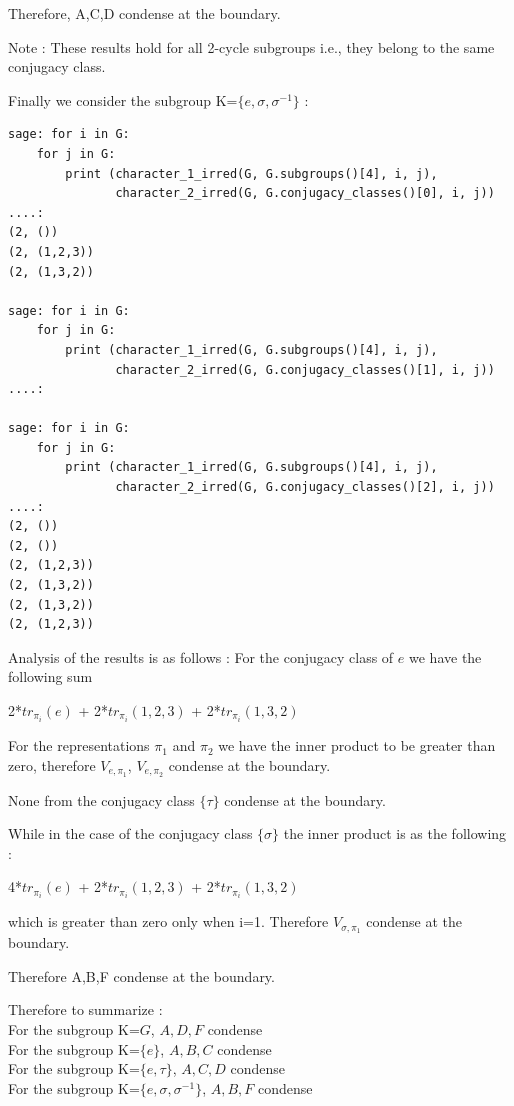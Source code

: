 Therefore, A,C,D condense at the boundary.

Note : These results hold for all 2-cycle subgroups i.e., they belong to the same conjugacy class.


Finally we consider the subgroup K=$\{e, \sigma, \sigma^{-1}\}$ :

\begin{lstlisting}[frame=single]
sage: for i in G:
    for j in G:
        print (character_1_irred(G, G.subgroups()[4], i, j), 
               character_2_irred(G, G.conjugacy_classes()[0], i, j))
....: 
(2, ())
(2, (1,2,3))
(2, (1,3,2))

sage: for i in G:
    for j in G:
        print (character_1_irred(G, G.subgroups()[4], i, j), 
               character_2_irred(G, G.conjugacy_classes()[1], i, j))
....: 

sage: for i in G:
    for j in G:
        print (character_1_irred(G, G.subgroups()[4], i, j), 
               character_2_irred(G, G.conjugacy_classes()[2], i, j))
....: 
(2, ())
(2, ())
(2, (1,2,3))
(2, (1,3,2))
(2, (1,3,2))
(2, (1,2,3))
\end{lstlisting}

Analysis of the results is as follows :
For the conjugacy class of $e$ we have the following sum
\begin{center}
2*$tr_{\pi_{i}}(e)$ + 2*$tr_{\pi_{i}}(1,2,3)$ + 2*$tr_{\pi_{i}}(1,3,2)$ 
\end{center}
For the representations $\pi_{1}$ and $\pi_{2}$ we have the inner product to be greater than zero, therefore
$V_{e, \pi_{1}}$, $V_{e, \pi_{2}}$ condense at the boundary.

None from the conjugacy class $\{\tau\}$ condense at the boundary.

While in the case of the conjugacy class $\{\sigma\}$ the inner product is as the following :
\begin{center}
4*$tr_{\pi_{i}}(e)$ + 2*$tr_{\pi_{i}}(1,2,3)$ + 2*$tr_{\pi_{i}}(1,3,2)$
\end{center}
which is greater than zero only when i=1.
Therefore $V_{\sigma, \pi_{1}}$ condense at the boundary.

Therefore A,B,F condense at the boundary.

Therefore to summarize :\\
For the subgroup K=$G$, $A, D, F$ condense \\
For the subgroup K=$\{e\}$,  $A, B, C$ condense \\
For the subgroup K=$\{e, \tau\}$, $A, C, D$ condense \\
For the subgroup K=$\{e, \sigma, \sigma^{-1}\}$, $A, B, F$ condense \\

